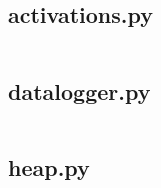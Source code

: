 \begin{flushleft}
    \subsection{activations.py}
    \inputminted[frame=leftline,framesep=2mm,baselinestretch=1.2,fontsize=\small,linenos]{python}{../Scripts/activations.py}

    \subsection{datalogger.py}
    \inputminted[frame=leftline,framesep=2mm,baselinestretch=1.2,fontsize=\small,linenos]{python}{../Scripts/datalogger.py}

    \subsection{heap.py}
    \inputminted[frame=leftline,framesep=2mm,baselinestretch=1.2,fontsize=\small,linenos]{python}{../Scripts/heap.py}
\end{flushleft}